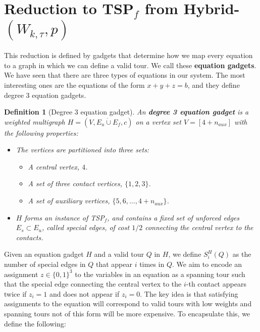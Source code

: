 \documentclass[12pt]{article}
\newtheorem{definition}{Definition}
\begin{document}
\section{Reduction to TSP$_f$ from Hybrid-$(W_{k,\tau},p)$}
This reduction is defined by gadgets that determine how we map every equation to a graph in which we can define a valid tour. We call these \textbf{equation gadgets}.
We have seen that there are three types of equations in our system. The most interesting ones are the equations of the form $x+y+z=b$, and they define degree 3 equation gadgets. 
\begin{definition}[Degree 3 equation gadget]
    An \textbf{degree 3 equation gadget} is a weighted multigraph $H=(V,E_u\dot\cup E_f, c)$ on a vertex set $V= [4+n_{aux}]$ with the following properties:
    \begin{itemize}
        \item The vertices are partitioned into three sets: 
        \begin{itemize}
            \item A central vertex, $4$.
            \item A set of three contact vertices, $\{1,2,3\}$.
            \item A set of auxiliary vertices, $\{5,6,\ldots,4+n_{aux}\}$.
        \end{itemize}
        \item $H$ forms an instance of TSP$_f$, and contains a fixed set of unforced edges $E_s\subset E_u$, called \textit{special edges}, of cost $1/2$ connecting the central vertex to the contacts. 
    \end{itemize}
\end{definition}
Given an equation gadget $H$ and a valid tour $Q$ in $H$, we define $S_i^H(Q)$ as the number of special edges  in $Q$ that appear $i$ times in $Q$. 
We aim to encode an assignment $z\in {\{0,1\}}^3$ to the variables in an equation as a spanning tour such that the special edge connecting the central vertex to the $i$-th contact appears twice if $z_i=1$ and does not appear if $z_i=0$.
The key idea is that satisfying assignments to the equation will correspond to valid tours with low weights and spanning tours not of this form will be more expensive.
To encapsulate this, we define the following: 
\end{document}
